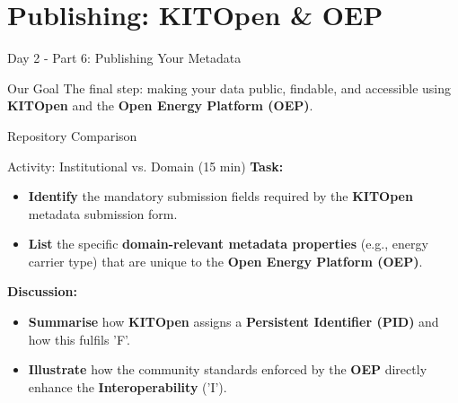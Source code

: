 \documentclass{integrity} %
\begin{document}
\section{Publishing: KITOpen \& OEP}

\begin{frame}{Day 2 - Part 6: Publishing Your Metadata}
    \begin{block}{Our Goal}
        The final step: making your data public, findable, and accessible using \textbf{KITOpen} and the \textbf{Open Energy Platform (OEP)}.
    \end{block}
\end{frame}

\begin{frame}{Repository Comparison}
    \begin{block}{Activity: Institutional vs. Domain (15 min)}
        \textbf{Task:}
        \begin{itemize}
            \item \textbf{Identify} the mandatory submission fields required by the \textbf{KITOpen} metadata submission form.
            \item \textbf{List} the specific \textbf{domain-relevant metadata properties} (e.g., energy carrier type) that are unique to the \textbf{Open Energy Platform (OEP)}.
        \end{itemize}
        \pause
        \textbf{Discussion:}
        \begin{itemize}
            \item \textbf{Summarise} how \textbf{KITOpen} assigns a \textbf{Persistent Identifier (PID)} and how this fulfils 'F'.
            \item \textbf{Illustrate} how the community standards enforced by the \textbf{OEP} directly enhance the \textbf{Interoperability} ('I').
        \end{itemize}
    \end{block}
\end{frame}
\end{document}
